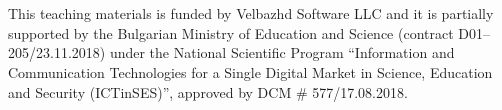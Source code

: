 \documentclass[a4paper,12pt]{minimal}
\begin{document}
\begin{Form}[action=mailto:todor.balabanov@gmail.com,encoding=text,method=post]
\\ \\

{\ssmall This teaching materials is funded by Velbazhd Software LLC and it is partially supported by the Bulgarian Ministry of Education and Science (contract D01–205/23.11.2018) under the National Scientific Program ``Information and Communication Technologies for a Single Digital Market in Science, Education and Security (ICTinSES)'', approved by DCM \# 577/17.08.2018.}

\end{Form}
\end{document}
